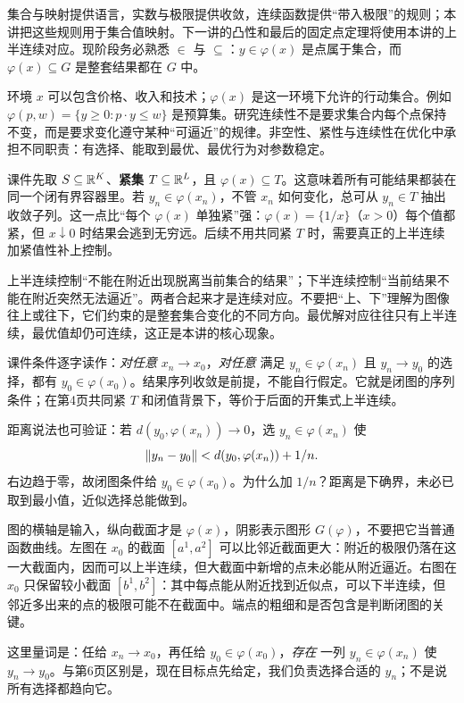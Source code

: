 集合与映射提供语言，实数与极限提供收敛，连续函数提供“带入极限”的规则；本讲把这些规则用于集合值映射。下一讲的凸性和最后的固定点定理将使用本讲的上半连续对应。现阶段务必熟悉 $\in$ 与 $\subseteq$：$y\in\varphi(x)$ 是点属于集合，而 $\varphi(x)\subseteq G$ 是整套结果都在 $G$ 中。

环境 $x$ 可以包含价格、收入和技术；$\varphi(x)$ 是这一环境下允许的行动集合。例如 $\varphi(p,w)=\{y\ge0:p\cdot y\le w\}$ 是预算集。研究连续性不是要求集合内每个点保持不变，而是要求变化遵守某种“可逼近”的规律。非空性、紧性与连续性在优化中承担不同职责：有选择、能取到最优、最优行为对参数稳定。

课件先取 $S\subseteq\mathbb{R}^K$、\textbf{紧集} $T\subseteq\mathbb{R}^L$，且 $\varphi(x)\subseteq T$。这意味着所有可能结果都装在同一个闭有界容器里。若 $y_n\in\varphi(x_n)$，不管 $x_n$ 如何变化，总可从 $y_n\in T$ 抽出收敛子列。这一点比“每个 $\varphi(x)$ 单独紧”强：$\varphi(x)=\{1/x\}$（$x>0$）每个值都紧，但 $x\downarrow0$ 时结果会逃到无穷远。后续不用共同紧 $T$ 时，需要真正的上半连续加紧值性补上控制。

上半连续控制“不能在附近出现脱离当前集合的结果”；下半连续控制“当前结果不能在附近突然无法逼近”。两者合起来才是连续对应。不要把“上、下”理解为图像往上或往下，它们约束的是整套集合变化的不同方向。最优解对应往往只有上半连续，最优值却仍可连续，这正是本讲的核心现象。

课件条件逐字读作：\emph{对任意} $x_n\to x_0$，\emph{对任意} 满足 $y_n\in\varphi(x_n)$ 且 $y_n\to y_0$ 的选择，都有 $y_0\in\varphi(x_0)$。结果序列收敛是前提，不能自行假定。它就是闭图的序列条件；在第4页共同紧 $T$ 和闭值背景下，等价于后面的开集式上半连续。

距离说法也可验证：若 $d(y_0,\varphi(x_n))\to0$，选 $y_n\in\varphi(x_n)$ 使
\[\left\lVert y_n-y_0\right\rVert<d(y_0,\varphi(x_n))+1/n.\]
右边趋于零，故闭图条件给 $y_0\in\varphi(x_0)$。为什么加 $1/n$？距离是下确界，未必已取到最小值，近似选择总能做到。

图的横轴是输入，纵向截面才是 $\varphi(x)$，阴影表示图形 $G(\varphi)$，不要把它当普通函数曲线。左图在 $x_0$ 的截面 $[a^1,a^2]$ 可以比邻近截面更大：附近的极限仍落在这一大截面内，因而可以上半连续，但大截面中新增的点未必能从附近逼近。右图在 $x_0$ 只保留较小截面 $[b^1,b^2]$：其中每点能从附近找到近似点，可以下半连续，但邻近多出来的点的极限可能不在截面中。端点的粗细和是否包含是判断闭图的关键。

这里量词是：任给 $x_n\to x_0$，再任给 $y_0\in\varphi(x_0)$，\emph{存在} 一列 $y_n\in\varphi(x_n)$ 使 $y_n\to y_0$。与第6页区别是，现在目标点先给定，我们负责选择合适的 $y_n$；不是说所有选择都趋向它。

